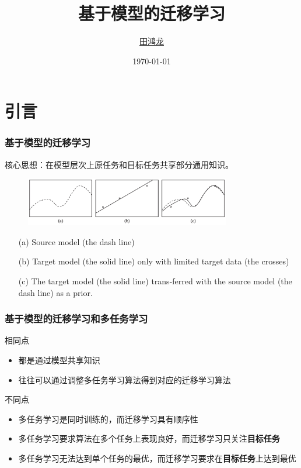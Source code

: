 \documentclass[aspectratio=169]{beamer}
\title{基于模型的迁移学习}
\author{\href{mailto:}{田鸿龙}}
\institute{LAMDA, Nanjing University}
\date{\today}
\begin{document}
\frame{\titlepage}


\section{引言}
\begin{frame}
  \frametitle{基于模型的迁移学习}
  核心思想：在模型层次上原任务和目标任务共享部分通用知识。
  \begin{figure}
    \centering
    \includegraphics[width=0.8\textwidth]{imgs/model_based_TL.png}
  \end{figure}
  
  \begin{itemize}
    \item [(a)]Source model (the dash line)
    \item [(b)] Target model (the solid line) only with limited target data (the crosses)
    \item [(c)] The target model (the solid line) trans-ferred with the source model (the dash line) as a prior.

  \end{itemize}
\end{frame}

\begin{frame}
  \frametitle{基于模型的迁移学习和多任务学习}
  相同点
  \begin{itemize}
    \item 都是通过模型共享知识
    \item 往往可以通过调整多任务学习算法得到对应的迁移学习算法
  \end{itemize}
  不同点
  \begin{itemize}
    \item 多任务学习是同时训练的，而迁移学习具有顺序性
    \item 多任务学习要求算法在多个任务上表现良好，而迁移学习只关注\textbf{目标任务}
    \item 多任务学习无法达到单个任务的最优，而迁移学习要求在\textbf{目标任务}上达到最优
  \end{itemize}
\end{frame}
\end{document}
